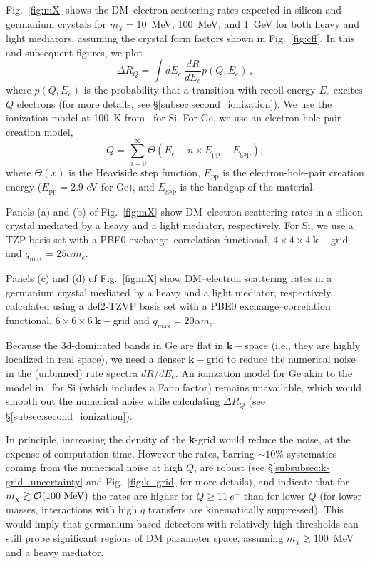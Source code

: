 \documentclass[
    prd, twocolumn, superscriptaddress, nofootinbib, amsmath, amssymb,
    aps, floatfix,preprintnumbers
]{revtex4-2}
\begin{document}
        Fig.~\ref{fig:mX} shows the DM--electron scattering rates expected in silicon and germanium crystals for $m_\chi = 10$~MeV, 100~MeV, and 1~GeV for both heavy and light mediators, assuming the crystal form factors shown in Fig.~\ref{fig:cff}. In this and subsequent figures, we plot 
        \begin{equation}
            \Delta R_Q = \int dE_e\ \frac{dR}{dE_e} p(Q, E_e)\,,
        \end{equation}
        where $p(Q, E_e)$ is the probability that a transition with recoil energy $E_e$ excites $Q$ electrons (for more details, see \S\ref{subsec:second_ionization}). We use the ionization model at 100~K from~\cite{Ramanathan2020} for Si. For Ge, we use an electron-hole-pair creation model, 
        \begin{equation}\label{eq:pair_creation}
            Q = \sum_{n = 0}^\infty \Theta\left(E_e - n\times E_\mathrm{pp} - E_\mathrm{gap}\right),
        \end{equation}
        where $\Theta(x)$ is the Heaviside step function, $E_\mathrm{pp}$ is the electron-hole-pair creation energy ($E_\mathrm{pp} = 2.9$ eV for Ge), and $E_\mathrm{gap}$ is the bandgap of the material.

        Panels (a) and (b) of Fig.~\ref{fig:mX} show DM--electron scattering rates in a silicon crystal mediated by a heavy and a light mediator, respectively. For Si, we use a TZP basis set with a PBE0 exchange--correlation functional, $4\times4\times4\ \mathbf{k}-$grid and $q_\mathrm{max} = 25\alpha m_e$.
        
        Panels (c) and (d) of Fig.~\ref{fig:mX} show DM--electron scattering rates in a germanium crystal mediated by a heavy and a light mediator, respectively, calculated using a def2-TZVP basis set with a PBE0 exchange--correlation functional, $6\times6\times6\ \mathbf{k}-$grid and $q_\mathrm{max} = 20\alpha m_e.$
        
        Because the 3d-dominated bands in Ge are flat in $\mathbf{k}-$space (i.e., they are highly localized in real space), we need a denser $\mathbf{k}-$grid to reduce the numerical noise in the (unbinned) rate spectra $dR/dE_e$. An ionization model for Ge akin to the model in~\cite{Ramanathan2020} for Si (which includes a Fano factor) remains unavailable, which would smooth out the numerical noise while calculating $\Delta R_Q$ (see \S \ref{subsec:second_ionization}). 
        
        In principle, increasing the density of the \textbf{k}-grid would reduce the noise, at the expense of computation time. However the rates, barring $\sim 10\%$ systematics coming from the numerical noise at high $Q$, are robust (see \S\ref{subsubsec:k-grid_uncertainty} and Fig.~\ref{fig:k_grid} for more details), and indicate that for $m_\chi \gtrsim \order{100\rm\ MeV}$ the rates are higher for $Q\geq11\ e^-$ than for lower $Q$ (for lower masses, interactions with high $q$ transfers are kinematically suppressed). This would imply that germanium-based detectors with relatively high thresholds can still probe significant regions of DM parameter space, assuming $m_\chi \gtrsim 100$~MeV and a heavy mediator.
\end{document}
